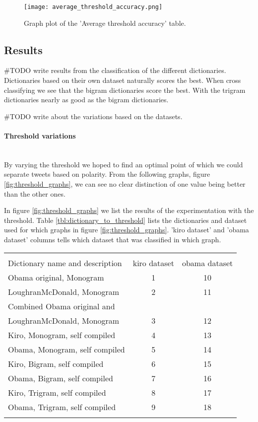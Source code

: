 \begin{figure}[htb]
    \centering
    \texttt{[image: average\_threshold\_accuracy.png]} 
    \caption{Graph plot of the 'Average threshold accuracy' table.}
    \label{fig:average_threshold_accuracy}
\end{figure}
%

\subsection{Results}
#TODO write results from the classification of the different dictionaries. \\
Dictionaries based on their own dataset naturally scores the best. When cross
classifying we see that the bigram dictionaries score the best. With the
trigram dictionaries nearly as good as the bigram dictionaries.

#TODO write about the variations based on the datasets. \\

\paragraph{Threshold variations}
\hspace{0pt}\\
By varying the threshold we hoped to find an optimal point of which we could
separate tweets based on polarity. From the following
graphs, figure \ref{fig:threshold_graphs}, we can see no clear distinction of
one value being better than the other ones.  

In figure \ref{fig:threshold_graphs} we list the results of the experimentation
with the threshold. Table \ref{tbl:dictionary_to_threshold} lists the
dictionaries and dataset used for which graphs in figure \ref{fig:threshold_graphs}.
'kiro dataset' and 'obama dataset' columns tells which dataset that was
classified in which graph.

\begin{tabular}{ l c c }
\hspace{0pt}\\
Dictionary name and description & kiro dataset & obama dataset \\ 
Obama original, Monogram & 1 & 10 \\
LoughranMcDonald, Monogram & 2 & 11 \\
Combined Obama original and \\ LoughranMcDonald, Monogram & 3 & 12 \\
Kiro, Monogram, self compiled & 4 & 13 \\
Obama, Monogram, self compiled & 5 & 14 \\
Kiro, Bigram, self compiled & 6 & 15 \\
Obama, Bigram, self compiled & 7 & 16 \\
Kiro, Trigram, self compiled & 8 & 17 \\
Obama, Trigram, self compiled & 9 & 18 \\

\label{tbl:dictionary_to_threshold}
\end{tabular}

